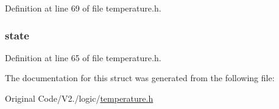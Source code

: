 \-Definition at line 69 of file temperature.\-h.

\hypertarget{structtemp_ac6b2518df4ca45cee089e61f152572b2}{
\subsubsection[{state}]{ {\bf state}}}\label{structtemp_ac6b2518df4ca45cee089e61f152572b2}


\-Definition at line 65 of file temperature.\-h.



\-The documentation for this struct was generated from the following file\-:\begin{DoxyCompactItemize}
\item 
\-Original Code/\-V2./logic/\hyperlink{temperature_8h}{temperature.\-h}\end{DoxyCompactItemize}
